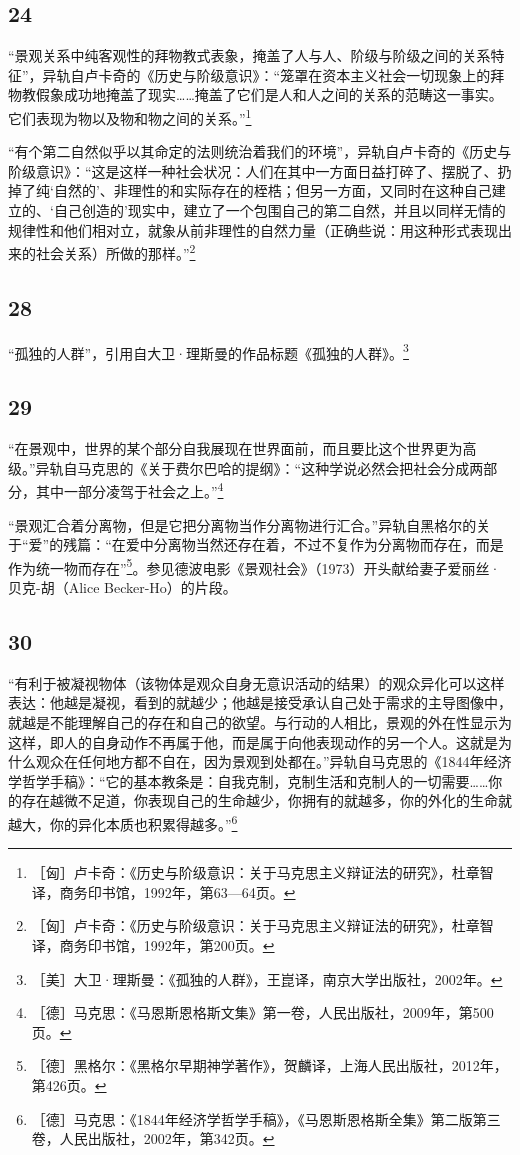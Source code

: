 \documentclass[fontset=fandol, a4paper, 12pt, openright]{ctexbook}
\begin{document}
\subsection*{24}
“景观关系中纯客观性的拜物教式表象，掩盖了人与人、阶级与阶级之间的关系特征”，异轨自卢卡奇的《历史与阶级意识》：“笼罩在资本主义社会一切现象上的拜物教假象成功地掩盖了现实……掩盖了它们是人和人之间的关系的范畴这一事实。它们表现为物以及物和物之间的关系。”\footnote{［匈］卢卡奇：《历史与阶级意识：关于马克思主义辩证法的研究》，杜章智译，商务印书馆，1992年，第63—64页。}

“有个第二自然似乎以其命定的法则统治着我们的环境”，异轨自卢卡奇的《历史与阶级意识》：“这是这样一种社会状况：人们在其中一方面日益打碎了、摆脱了、扔掉了纯‘自然的’、非理性的和实际存在的桎梏；但另一方面，又同时在这种自己建立的、‘自己创造的’现实中，建立了一个包围自己的第二自然，并且以同样无情的规律性和他们相对立，就象从前非理性的自然力量（正确些说：用这种形式表现出来的社会关系）所做的那样。”\footnote{［匈］卢卡奇：《历史与阶级意识：关于马克思主义辩证法的研究》，杜章智译，商务印书馆，1992年，第200页。}

\subsection*{28}
“孤独的人群”，引用自大卫·理斯曼的作品标题《孤独的人群》。\footnote{［美］大卫·理斯曼：《孤独的人群》，王崑译，南京大学出版社，2002年。}

\subsection*{29}
“在景观中，世界的某个部分自我展现在世界面前，而且要比这个世界更为高级。”异轨自马克思的《关于费尔巴哈的提纲》：“这种学说必然会把社会分成两部分，其中一部分凌驾于社会之上。”\footnote{［德］马克思：《马恩斯恩格斯文集》第一卷，人民出版社，2009年，第500页。}

“景观汇合着分离物，但是它把分离物当作分离物进行汇合。”异轨自黑格尔的关于“爱”的残篇：“在爱中分离物当然还存在着，不过不复作为分离物而存在，而是作为统一物而存在”\footnote{［德］黑格尔：《黑格尔早期神学著作》，贺麟译，上海人民出版社，2012年，第426页。}。参见德波电影《景观社会》（1973）开头献给妻子爱丽丝·贝克-胡（Alice Becker-Ho）的片段。

\subsection*{30}
“有利于被凝视物体（该物体是观众自身无意识活动的结果）的观众异化可以这样表达：他越是凝视，看到的就越少；他越是接受承认自己处于需求的主导图像中，就越是不能理解自己的存在和自己的欲望。与行动的人相比，景观的外在性显示为这样，即人的自身动作不再属于他，而是属于向他表现动作的另一个人。这就是为什么观众在任何地方都不自在，因为景观到处都在。”异轨自马克思的《1844年经济学哲学手稿》：“它的基本教条是：自我克制，克制生活和克制人的一切需要……你的存在越微不足道，你表现自己的生命越少，你拥有的就越多，你的外化的生命就越大，你的异化本质也积累得越多。”\footnote{［德］马克思：《1844年经济学哲学手稿》，《马恩斯恩格斯全集》第二版第三卷，人民出版社，2002年，第342页。}
\end{document}
